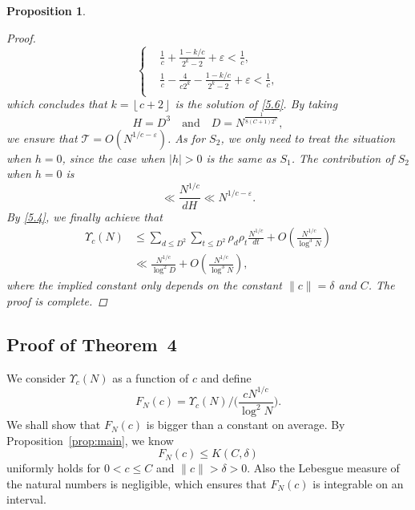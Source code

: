 \documentclass[12pt, reqno, twoside, letterpaper]{amsart}
\numberwithin{equation}{section}
\def\eps{\varepsilon}
\def\fl#1{\left\lfloor#1\right\rfloor}
\newcommand{\cT}{\ensuremath{\mathcal{T}}}
\theoremstyle{customthm}
\newtheorem{proposition}[X]{Proposition}
\theoremstyle{customrem}
\begin{document}
\begin{proposition}
\begin{proof}
\begin{equation}
	\label{5.6}
	\left\{
	\begin{matrix}
		&\frac{1}{c}+\frac{1-k/c}{2^k-2}+\eps<\frac{1}{c}, \\
		&\frac{1}{c}-\frac{4}{c2^k}-\frac{1-k/c}{2^k-2}+\eps<\frac{1}{c}, \\
	\end{matrix}
	\right.
\end{equation}
which concludes that $k=\fl{c+2}$ is the solution of \eqref{5.6}. By taking 
$$
H=D^3\quad \text{and}\quad D=N^{\frac{1}{8(C+1)2^{C}}},
$$
we ensure that $\cT=O(N^{1/c-\eps})$. As for $S_2$, we only need to treat the situation when $h=0$, since the case when $|h|>0$ is the same as $S_1$. The contribution of $S_2$
when $h=0$ is
$$
\ll \frac{N^{1/c}}{dH}\ll N^{1/c-\varepsilon}.
$$
By \eqref{5.4}, we finally achieve that 
\begin{align*}
\Upsilon_c(N)&\leqslant\sum_{d\leqslant D^2}\sum_{t\leqslant D^2}\rho_d\rho_t \frac{N^{1/c}}{dt}+O(\frac{N^{1/c}}{\log ^3N})\\
&\ll \frac{N^{1/c}}{\log ^2D}+O(\frac{N^{1/c}}{\log ^3N}),
\end{align*}
where the implied constant only depends on the constant $\|c\|=\delta$ and $C$. The proof is complete.
\end{proof}
\end{proposition}




\subsection{Proof of Theorem~4}
We consider $\Upsilon_c(N)$ as a function of $c$ and define
$$
F_N(c)=\Upsilon_c(N)\bigg/ \big(\frac{cN^{1/c}}{\log ^2N} \big).
$$
We shall show that $F_N(c)$ is bigger than a constant on average. By Proposition~\ref{prop:main}, we know 
$$
F_N(c)\leqslant K(C,\delta) 
$$
uniformly holds for $0<c\leqslant C$ and $\|c\|>\delta>0$. Also the Lebesgue measure of the natural numbers is negligible, which ensures that $F_N(c)$ is integrable on an interval.
\end{document}
